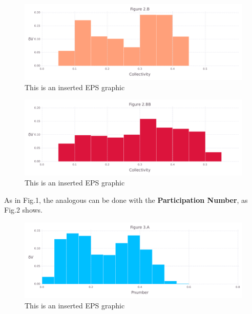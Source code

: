 \documentclass[10pt,letterpaper]{article}
\begin{document}
\begin{figure}[ht]
\begin{center}
\includegraphics[scale=0.5]{1m14/2bfigure.pdf}
\caption{This is an inserted EPS graphic}
\label{fig5}
\end{center}
\end{figure}

\begin{figure}[ht]
\begin{center}
\includegraphics[scale=0.5]{1m14/2bbfigure.pdf}
\caption{This is an inserted EPS graphic}
\label{fig6}
\end{center}
\end{figure}

\clearpage
As in Fig.1, the analogous can be done with the \textbf{Participation Number}, as Fig.2 shows.

\begin{figure}[ht]
\begin{center}
\includegraphics[scale=0.5]{1m14/3afigure.pdf}
\caption{This is an inserted EPS graphic}
\label{fig7}
\end{center}
\end{figure}
\end{document}
